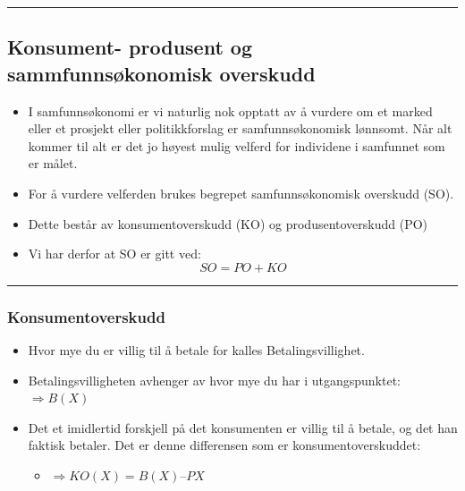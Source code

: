 \documentclass[
  letterpaper,
  DIV=11,
  numbers=noendperiod]{scrartcl}
\providecommand{\tightlist}{%
  \setlength{\itemsep}{0pt}\setlength{\parskip}{0pt}}\usepackage{longtable,booktabs,array}
\begin{document}
\begin{center}\rule{0.5\linewidth}{0.5pt}\end{center}

\subsection{Konsument- produsent og sammfunnsøkonomisk
overskudd}\label{konsument--produsent-og-sammfunnsuxf8konomisk-overskudd}

\begin{itemize}
\tightlist
\item
  I samfunnsøkonomi er vi naturlig nok opptatt av å vurdere om et marked
  eller et prosjekt eller politikkforslag er samfunnsøkonomisk lønnsomt.
  Når alt kommer til alt er det jo høyest mulig velferd for individene i
  samfunnet som er målet.
\item
  For å vurdere velferden brukes begrepet samfunnsøkonomisk overskudd
  (SO).
\item
  Dette består av konsumentoverskudd (KO) og produsentoverskudd (PO)
\item
  Vi har derfor at SO er gitt ved: \begin{equation*}
  SO=PO+KO
  \end{equation*}
\end{itemize}

\begin{center}\rule{0.5\linewidth}{0.5pt}\end{center}

\subsubsection{Konsumentoverskudd}\label{konsumentoverskudd}

\begin{itemize}
\tightlist
\item
  Hvor mye du er villig til å betale for kalles Betalingsvillighet.
\item
  Betalingsvilligheten avhenger av hvor mye du har i utgangspunktet:
  \(\Rightarrow B(X)\)
\item
  Det et imidlertid forskjell på det konsumenten er villig til å betale,
  og det han faktisk betaler. Det er denne differensen som er
  konsumentoverskuddet:

  \begin{itemize}
  \tightlist
  \item
    \(\Rightarrow KO(X) = B(X) – PX\)
  \end{itemize}
\end{itemize}
\end{document}
